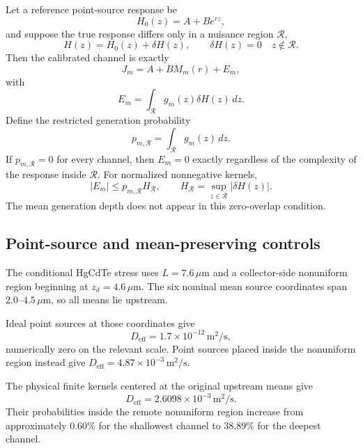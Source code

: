 \documentclass[aps,pra,twocolumn,superscriptaddress,nofootinbib]{revtex4-2}
\newcommand{\Deff}{D_{\mathrm{eff}}}
\newcommand{\Rregion}{\mathcal{R}}
\begin{document}
Let a reference point-source response be
\begin{equation}
H_0(z)=A+B e^{rz},
\end{equation}
and suppose the true response differs only in a nuisance region $\Rregion$,
\begin{equation}
H(z)=H_0(z)+\delta H(z),
\qquad
\delta H(z)=0\quad z\notin\Rregion.
\end{equation}
Then the calibrated channel is exactly
\begin{equation}
J_m=A+B M_m(r)+E_m,
\end{equation}
with
\begin{equation}
\boxed{
E_m=\int_{\Rregion}g_m(z)\delta H(z)\,dz.
}
\label{eq:leakage}
\end{equation}
Define the restricted generation probability
\begin{equation}
p_{m,\Rregion}=\int_{\Rregion}g_m(z)\,dz.
\end{equation}
If $p_{m,\Rregion}=0$ for every channel, then $E_m=0$ exactly regardless of the complexity of the response inside $\Rregion$. For normalized nonnegative kernels,
\begin{equation}
\boxed{
|E_m|\le p_{m,\Rregion}H_{\Rregion},
\qquad
H_{\Rregion}=\sup_{z\in\Rregion}|\delta H(z)|.
}
\label{eq:leakbound}
\end{equation}
The mean generation depth does not appear in this zero-overlap condition.

\subsection{Point-source and mean-preserving controls}

The conditional HgCdTe stress uses $L=7.6\,\mu\mathrm{m}$ and a collector-side nonuniform region beginning at $z_d=4.6\,\mu\mathrm{m}$. The six nominal mean source coordinates span $2.0$--$4.5\,\mu\mathrm{m}$, so all means lie upstream.

Ideal point sources at those coordinates give
\begin{equation}
\Deff=1.7\times10^{-12}\,\mathrm{m^2/s},
\end{equation}
numerically zero on the relevant scale. Point sources placed inside the nonuniform region instead give $\Deff=4.87\times10^{-3}\,\mathrm{m^2/s}$.

The physical finite kernels centered at the original upstream means give
\begin{equation}
\Deff=2.6098\times10^{-3}\,\mathrm{m^2/s}.
\label{eq:hgcdteD}
\end{equation}
Their probabilities inside the remote nonuniform region increase from approximately $0.60\%$ for the shallowest channel to $38.89\%$ for the deepest channel.
\end{document}
